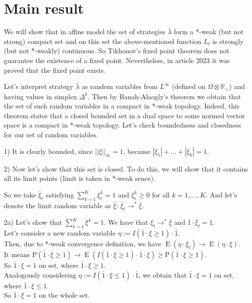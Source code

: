 \documentclass[a4paper,11pt,english]{article}
\theoremstyle{definition}
\DeclareMathOperator{\E}{E}
\renewcommand{\P}{\mathrm{P}}
\newcommand{\R}{\mathbb{R}}
\begin{document}
\section{Main result}
We will show that in affine model the set of strategies $\bar\lambda$ form a *-weak (but not strong) compact set 
and on this set the above-mentioned function $L_t$ is strongly (but not *-weakly) continuous. 
So Tikhonov's fixed point theorem does not guarantee the existence of a fixed point. 
Nevertheless, in article 2023 it was proved that the fixed point exists.

Let's interpret strategy $\bar\lambda$ as random variables from $L^{\infty}$ 
(defined on $\Omega \otimes \R_+$) and having values in simplex $\Delta^k$.
Then by Banah-Alaogly's theorem we obtain that the set of such random variables in a compact in *-weak topology.
Indeed, this theorem states that a closed bounded set in a dual space to some normed vector 
space is a compact in *-weak topology. Let's check boundedness and closedness for our set of random variables.

1) It is clearly bounded, since $||\xi||_{\infty}=1$, because $|\xi_1| +\dots+ |\xi_k| =1$.

2) Now let's show that this set is closed. To do this, we will show that it contains all its limit points
 (limit is taken in *-weak sence).

 So we take $\bar\xi_t$ satisfying $\sum_{k=1}^K \xi_t^k =1$ and $\xi_t^k \geq 0$ for all $k=1,\dots,K$.
 And let's denote the limit random variable as $\bar\xi$: $\bar\xi_t \to^{*} \bar\xi$.

 2a) Let's show that $\sum_{k=1}^K \xi^k =1$.
 We have that $\xi_t \to^{*} \xi$ and $\bar 1 \cdot \bar \xi_t =1$.\\
 Let's consider a new random variable $\eta:=I\left(\bar 1\cdot \xi \geq 1\right) \cdot \bar 1$.\\
 Then, due to *-weak convergence definition, 
 we have $\E\left(\eta \cdot \xi_t \right) \to \E\left( \eta \cdot \xi\right)$.\\
 It means 
 $\P(\bar 1 \cdot \xi \geq 1 ) \to \E\left( I\left( \bar 1 \cdot \xi \geq 1 \right) \cdot \bar 1 \cdot \xi \right) 
 \geq \P\left( \bar 1 \cdot \xi \geq 1\right)$.\\

 So $\bar 1 \cdot \xi =1$ on set, where $\bar 1 \cdot \xi \geq 1$.\\
 Analogously considering $\eta:=I\left(\bar 1\cdot \xi \leq 1\right) \cdot \bar 1$, we obtain that 
 $\bar 1 \cdot \xi =1$ on set, where $\bar 1 \cdot \xi \leq 1$.\\
 So $\bar 1 \cdot \xi =1$ on the whole set.
\end{document}

